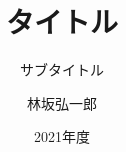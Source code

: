 \documentclass[12pt,dvipdfmx]{beamer}
\title{タイトル}
\subtitle{サブタイトル}
\author{林坂弘一郎}
\date{2021年度}
\institute[神戸学院大学]{神戸学院大学 経営学部}
\theoremstyle{example}
\begin{document}
\frame{\titlepage}
\section[Outline]{}
\frame{\tableofcontents}
% 
\end{document}
